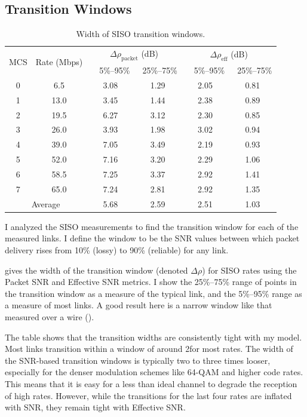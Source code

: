 \subsection{Transition Windows}
\begin{table}
\centering
\begin{tabular}{cccccc}
\toprule
\multirow{2}{*}{MCS} & \multirow{2}{*}{Rate (Mbps)} & \multicolumn{2}{c}{$\Delta\rho_{\text{packet}}$ (dB)} &
\multicolumn{2}{c}{$\Delta\rho_{\text{eff}}$ (dB)} \\ 
\cmidrule(lr){3-4} \cmidrule(lr){5-6}
& &  ~~5\%--95\% & ~25\%--75\% & ~~5\%--95\% & ~25\%--75\%  \\
\midrule 
0 &  6.5                    & 3.08  & 1.29  & 2.05  & 0.81 \\
1 & 13.0                    & 3.45  & 1.44  & 2.38  & 0.89 \\
2 & 19.5                    & 6.27  & 3.12  & 2.30  & 0.85 \\
3 & 26.0                    & 3.93  & 1.98  & 3.02  & 0.94 \\
4 & 39.0                    & 7.05  & 3.49  & 2.19  & 0.93 \\
5 & 52.0                    & 7.16  & 3.20  & 2.29  & 1.06 \\
6 & 58.5                    & 7.25  & 3.37  & 2.92  & 1.41 \\
7 & 65.0                    & 7.24  & 2.81  & 2.92  & 1.35 \\
\midrule
\multicolumn{2}{c}{Average} & 5.68  & 2.59  & 2.51  & 1.03 \\         
\bottomrule
\end{tabular}
\caption{\label{tab:transitions} Width of SISO transition windows.}
\end{table}

I analyzed the SISO measurements to find the transition window for each of the measured links. I define the window to be the SNR values between which packet delivery rises from 10\% (lossy) to 90\% (reliable) for any link.

 gives the width of the transition window (denoted $\Delta\rho$) for SISO rates using the Packet SNR and Effective SNR metrics. I show the 25\%--75\% range of points in the transition window as a measure of the typical link, and the 5\%--95\% range as a measure of most links. A good result here is a narrow window like that measured over a wire ().

The table shows that the transition widths are consistently tight with my model. Most links transition within a window of around 2\dB for most rates. The width of the SNR-based transition windows is typically two to three times looser, especially for the denser modulation schemes like 64-QAM and higher code rates. This means that it is easy for a less than ideal channel to degrade the reception of high rates. However, while the transitions for the last four rates are inflated with SNR, they remain tight with Effective SNR\@. 


